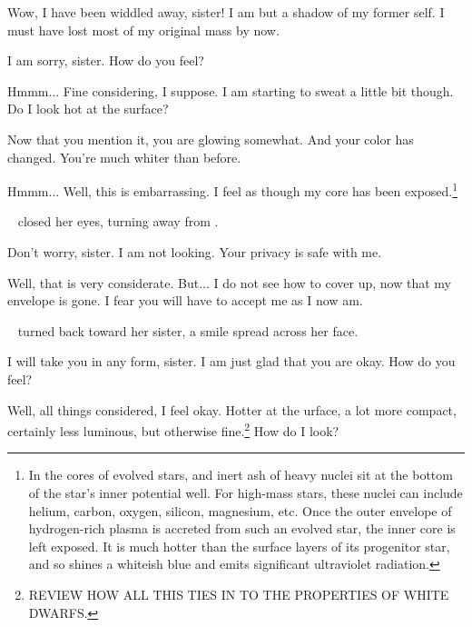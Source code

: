 \documentclass[main.tex]{subfiles}
\begin{document}
\par \Maia Wow, I have been widdled away, sister!  I am but a shadow of my former self.  I must have lost most of my original mass by now.  

\par \Merope I am sorry, sister.  How do you feel?

\par \Maia Hmmm... Fine considering, I suppose.  I am starting to sweat a little bit though.  Do I look hot at the surface?

\par \Merope Now that you mention it, you are glowing somewhat.  And your color has changed. You're much whiter than before.

\par \Maia Hmmm...  Well, this is embarrassing.  I feel as though my core has been exposed.\footnote{In the cores of evolved stars, and inert ash of heavy nuclei sit at the bottom of the star's inner potential well.  For high-mass stars, these nuclei can include helium, carbon, oxygen, silicon, magnesium, etc.  Once the outer envelope of hydrogen-rich plasma is accreted from such an evolved star, the inner core is left exposed.  It is much hotter than the surface layers of its progenitor star, and so shines a whiteish blue and emits significant ultraviolet radiation.}    

\par \nar \rmmerope~ closed her eyes, turning away from \rmmaia.

\par \Merope Don't worry, sister.  I am not looking.  Your privacy is safe with me.

\par \Maia Well, that is very considerate.  But... I do not see how to cover up, now that my envelope is gone. I fear you will have to accept me as I now am.

\par \nar \rmmerope~ turned back toward her sister, a smile spread across her face.

\par \Merope I will take you in any form, sister.  I am just glad that you are okay.  How do you feel?

\par \Maia Well, all things considered, I feel okay.  Hotter at the urface, a lot more compact, certainly less luminous, but otherwise fine.\footnote{REVIEW HOW ALL THIS TIES IN TO THE PROPERTIES OF WHITE DWARFS.}  How do I look?
\end{document}
